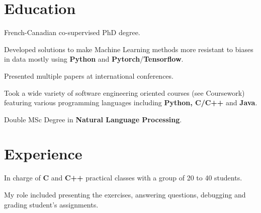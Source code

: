 \documentclass[]{deedy-resume-openfont}
\begin{document}
\begin{minipage}[t]{0.7\textwidth} 


\section{Education}
\vspace{\topsep}
\begin{tightemize}
\item French-Canadian co-supervised PhD degree.
\item Developed solutions to make Machine Learning methods more resistant to biases in data mostly using \textbf{Python} and \textbf{Pytorch}/\textbf{Tensorflow}.
\item Presented multiple papers at international conferences.
\end{tightemize}
\sectionsep

\begin{tightemize}
\item Took a wide variety of software engineering oriented courses (see Coursework) featuring various programming languages including \textbf{Python, C/C++} and \textbf{Java}.
\item Double MSc Degree in \textbf{Natural Language Processing}.
\end{tightemize}
\sectionsep

\sectionsep


\section{Experience}
\begin{tightemize}
\item In charge of \textbf{C} and \textbf{C++} practical classes with a group of 20 to 40 students.
\item My role included presenting the exercises, answering questions, debugging and grading student's assignments.
\end{tightemize}
\sectionsep


\end{minipage}
\end{document}
